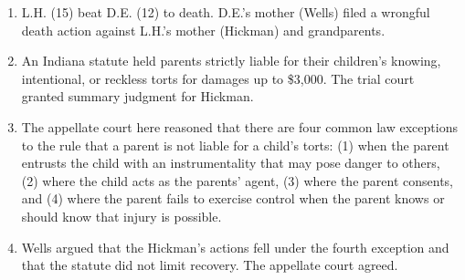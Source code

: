 \begin{enumerate}
    \item L.H. (15) beat D.E. (12) to death. D.E.'s mother (Wells) filed a 
    wrongful death action against L.H.'s mother (Hickman) and grandparents.
    \item An Indiana statute held parents strictly liable for their children's 
    knowing, intentional, or reckless torts for damages up to \$3,000. The trial 
    court granted summary judgment for Hickman.
    \item The appellate court here reasoned that there are four common law 
    exceptions to the rule that a parent is not liable for a child's torts: (1) 
    when the parent entrusts the child with an instrumentality that may pose 
    danger to others, (2) where the child acts as the parents' agent, (3) where 
    the parent consents, and (4) where the parent fails to exercise control when 
    the parent knows or should know that injury is possible.
    \item Wells argued that the Hickman's actions fell under the fourth 
    exception and that the statute did not limit recovery. The appellate court 
    agreed.
\end{enumerate}
